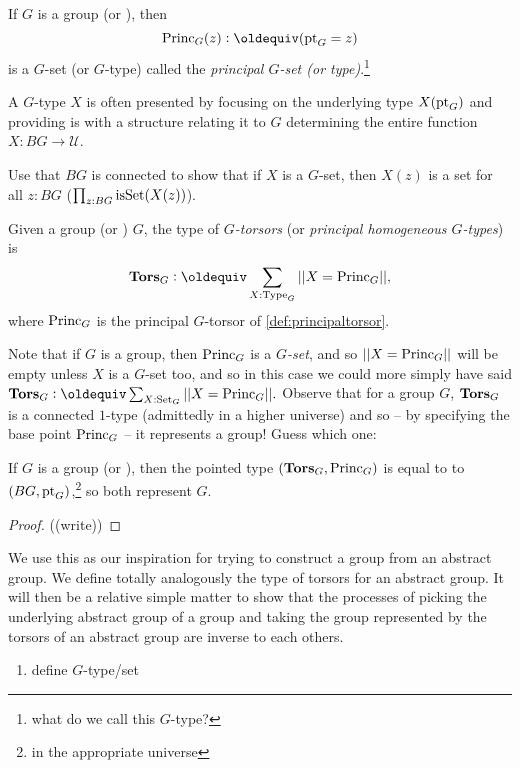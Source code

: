 \begin{example}\label{def:principaltorsor}
  If $G$ is a group (or \inftygp), then
$$\princ_G(z)\defequi(\pt_G=z)$$ is a $G$-set (or $G$-type) called the \emph{principal $G$-set (or type)}.\footnote{what do we call this $G$-type?}
\end{example}

\begin{remark}
  A $G$-type $X$ is often presented by focusing on the underlying type $X({\mathord{\mathrm{pt}}}_G)$  and providing is with a structure relating it to $G$ determining the entire function $X\colon BG\to\mathcal U$.
\end{remark}

\begin{xca}
  Use that $BG$ is connected to show that if $X$ is a $G$-set, then $X(z)$ is a set for all $z:BG$ (\ie $\prod_{z:BG}\mathrm{isSet}(X(z))$).
\end{xca}
\begin{definition}
  Given a group (or \inftygp) $G$, the type of {\em$G$-torsors} (or \emph{principal homogeneous $G$-types}) is
$$\typetorsor_G\defequi\sum_{X:\Type_G}||X=\princ_G||,$$
where $\mathrm{Princ}_G$ is the principal $G$-torsor of \cref{def:principaltorsor}.
\end{definition}
\begin{remark}
  Note that if $G$ is a group, then $\mathrm{Princ}_G$ is a $G${\em-set}, and so $||X=\mathrm{Princ}_G||$ will be empty unless $X$ is a $G$-set too, and so in this case we could more simply have said $\typetorsor_G\defequi\sum_{X:\Set_G}||X=\princ_G||.$  Observe that for a group $G$, $\mathbf{Tors}_G$ is a connected $1$-type (admittedly in a higher universe) and so -- by specifying the base point $\mathrm{Princ}_G$ -- it represents a group!  Guess which one:
\end{remark}
\begin{lemma}
  If $G$ is a group (or \inftygp), then the pointed type $(\mathbf{Tors}_G,\mathrm{Princ}_G)$ is equal to to $(BG,{\mathord{\mathrm{pt}}}_G)$,\footnote{in the appropriate universe} so both represent $G$.
\end{lemma}

\begin{proof}
  ((write))
\end{proof}

We use this as our inspiration for trying to construct a group from an abstract group.  We define totally analogously the type of torsors for an abstract group.  It will then be a relative simple matter to show that the processes of picking the underlying abstract group of a group and taking the group represented by the torsors of an abstract group are inverse to each others.
\begin{enumerate}
\item define $G$-type/set
\end{enumerate}
